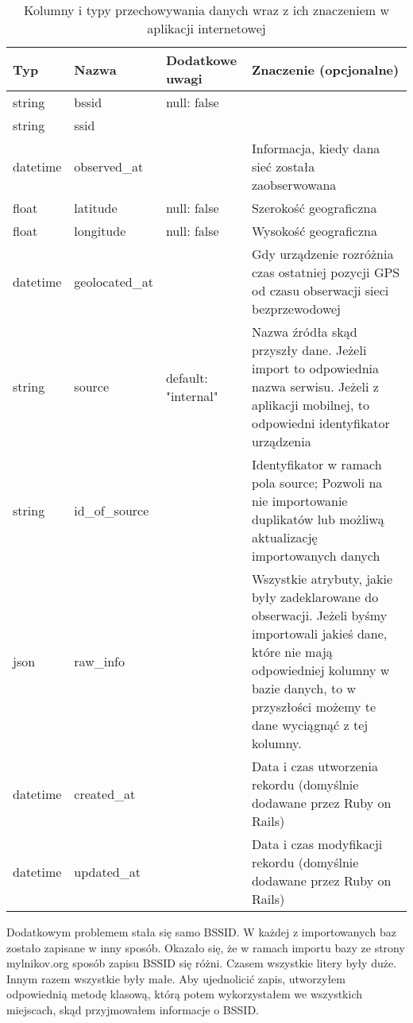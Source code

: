 \begin{table}
\caption{Kolumny i typy przechowywania danych wraz z ich znaczeniem w aplikacji internetowej}
\label{table:dbscheme}
\begin{tabular} { |l|l|l|p{6cm}|  }
\hline
Typ & Nazwa & Dodatkowe uwagi & Znaczenie (opcjonalne) \\
\hline
\hline
string   & bssid & null: false & \\
\hline
string   & ssid & & \\
\hline
datetime & observed\_at & & Informacja, kiedy dana sieć została zaobserwowana \\
\hline
float    & latitude & null: false & Szerokość geograficzna \\
\hline
float    & longitude & null: false & Wysokość geograficzna \\
\hline
datetime & geolocated\_at & & Gdy urządzenie rozróżnia czas ostatniej pozycji GPS od czasu obserwacji sieci bezprzewodowej \\
\hline
string   & source & default: "internal" & Nazwa źródła skąd przyszły dane. Jeżeli import to odpowiednia nazwa serwisu. Jeżeli z aplikacji mobilnej, to odpowiedni identyfikator urządzenia \\
\hline
string   & id\_of\_source & & Identyfikator w ramach pola source; Pozwoli na nie importowanie duplikatów lub możliwą aktualizację importowanych danych \\
\hline
json     & raw\_info & & Wszystkie atrybuty, jakie były zadeklarowane do obserwacji. Jeżeli byśmy importowali jakieś dane, które nie mają odpowiedniej kolumny w bazie danych, to w przyszłości możemy te dane wyciągnąć z tej kolumny. \\
\hline
datetime & created\_at & & Data i czas utworzenia rekordu (domyślnie dodawane przez Ruby on Rails) \\
\hline
datetime & updated\_at & & Data i czas modyfikacji rekordu (domyślnie dodawane przez Ruby on Rails) \\
\hline
\end{tabular}
\end{table}

Dodatkowym problemem stała się samo BSSID. W każdej z importowanych baz zostało zapisane w inny sposób. Okazało się, że w ramach importu bazy ze strony mylnikov.org sposób zapisu BSSID się różni. Czasem wszystkie litery były duże. Innym razem wszystkie były małe. Aby ujednolicić zapis, utworzyłem odpowiednią metodę klasową, którą potem wykorzystałem we wszystkich miejscach, skąd przyjmowałem informacje o BSSID.

